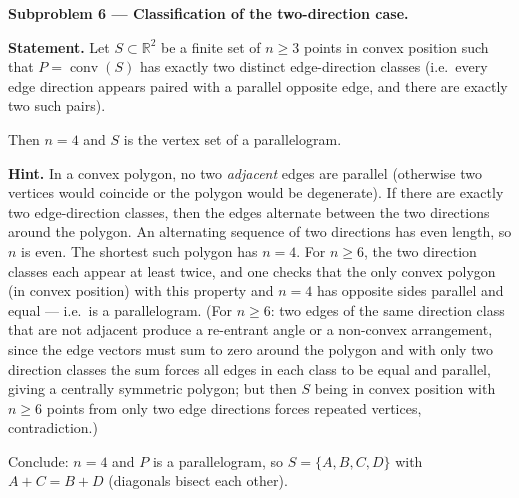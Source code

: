 \documentclass{article}
\begin{document}
\textbf{Subproblem 6 --- Classification of the two-direction case.}

\medskip
\textbf{Statement.}
Let $S\subset\mathbb{R}^2$ be a finite set of $n\ge 3$ points in convex position such that
$P=\operatorname{conv}(S)$ has exactly two distinct edge-direction classes
(i.e.\ every edge direction appears paired with a parallel opposite edge, and there are
exactly two such pairs).

Then $n=4$ and $S$ is the vertex set of a parallelogram.

\medskip
\textbf{Hint.}
In a convex polygon, no two \emph{adjacent} edges are parallel (otherwise two vertices would
coincide or the polygon would be degenerate).
If there are exactly two edge-direction classes, then the edges alternate between the two
directions around the polygon.  An alternating sequence of two directions has even length,
so $n$ is even.
The shortest such polygon has $n=4$.  For $n\ge 6$, the two direction classes each appear
at least twice, and one checks that the only convex polygon (in convex position) with this
property and $n=4$ has opposite sides parallel and equal --- i.e.\ is a parallelogram.
(For $n\ge 6$: two edges of the same direction class that are not adjacent produce a
re-entrant angle or a non-convex arrangement, since the edge vectors must sum to zero around
the polygon and with only two direction classes the sum forces all edges in each class to be
equal and parallel, giving a centrally symmetric polygon; but then $S$ being in convex position
with $n\ge 6$ points from only two edge directions forces repeated vertices, contradiction.)

Conclude: $n=4$ and $P$ is a parallelogram, so $S=\{A,B,C,D\}$ with
$A+C=B+D$ (diagonals bisect each other).
\end{document}

